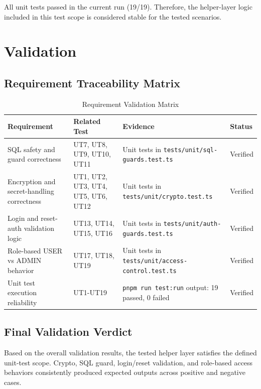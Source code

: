 All unit tests passed in the current run (19/19). Therefore, the helper-layer logic included in this test scope is considered stable for the tested scenarios.


\section{Validation}

\subsection{Requirement Traceability Matrix}

\begin{table}[H]
    \centering
    \caption{Requirement Validation Matrix}
    \label{tab:validation-matrix}
    \begin{tabular}{|p{}|p{}|p{}|p{}|}
        \hline
        \textbf{Requirement} & \textbf{Related Test} & \textbf{Evidence} & \textbf{Status} \\
        \hline
        SQL safety and guard correctness & UT7, UT8, UT9, UT10, UT11 & Unit tests in \texttt{tests/unit/sql-guards.test.ts} & Verified \\
        \hline
        Encryption and secret-handling correctness & UT1, UT2, UT3, UT4, UT5, UT6, UT12 & Unit tests in \texttt{tests/unit/crypto.test.ts} & Verified \\
        \hline
        Login and reset-auth validation logic & UT13, UT14, UT15, UT16 & Unit tests in \texttt{tests/unit/auth-guards.test.ts} & Verified \\
        \hline
        Role-based USER vs ADMIN behavior & UT17, UT18, UT19 & Unit tests in \texttt{tests/unit/access-control.test.ts} & Verified \\
        \hline
        Unit test execution reliability & UT1-UT19 & \texttt{pnpm run test:run} output: 19 passed, 0 failed & Verified \\
        \hline
    \end{tabular}
\end{table}

\subsection{Final Validation Verdict}

Based on the overall validation results, the tested helper layer satisfies the defined unit-test scope. Crypto, SQL guard, login/reset validation, and role-based access behaviors consistently produced expected outputs across positive and negative cases.

